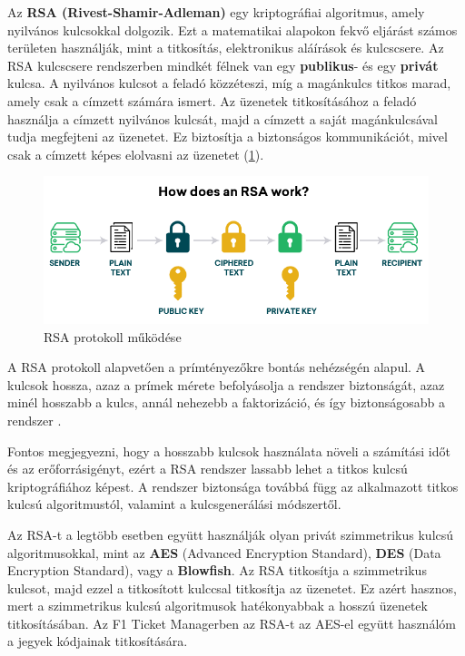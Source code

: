 Az \textbf{RSA (Rivest-Shamir-Adleman)} egy kriptográfiai algoritmus, amely nyilvános kulcsokkal dolgozik. Ezt a matematikai alapokon fekvő eljárást számos területen használják, mint a titkosítás, elektronikus aláírások és kulcscsere. Az RSA kulcscsere rendszerben mindkét félnek van egy \textbf{publikus}- és egy \textbf{privát} kulcsa. A nyilvános kulcsot a feladó közzéteszi, míg a magánkulcs titkos marad, amely csak a címzett számára ismert. Az üzenetek titkosításához a feladó használja a címzett nyilvános kulcsát, majd a címzett a saját magánkulcsával tudja megfejteni az üzenetet. Ez biztosítja a biztonságos kommunikációt, mivel csak a címzett képes elolvasni az üzenetet (\ref{abra:rsa}).

\begin{figure}[!h]
	\centering
	\includegraphics[scale=0.4]{images/rsa}
	\caption{RSA protokoll működése}
	\label{abra:rsa}
\end{figure}

A RSA protokoll alapvetően a prímtényezőkre bontás nehézségén alapul. A kulcsok hossza, azaz a prímek mérete befolyásolja a rendszer biztonságát, azaz minél hosszabb a kulcs, annál nehezebb a faktorizáció, és így biztonságosabb a rendszer \cite{SZTE}.

Fontos megjegyezni, hogy a hosszabb kulcsok használata növeli a számítási időt és az erőforrásigényt, ezért a RSA rendszer lassabb lehet a titkos kulcsú kriptográfiához képest. A rendszer biztonsága továbbá függ az alkalmazott titkos kulcsú algoritmustól, valamint a kulcsgenerálási módszertől.

Az RSA-t a legtöbb esetben együtt használják olyan privát szimmetrikus kulcsú algoritmusokkal, mint az \textbf{AES} (Advanced Encryption Standard), \textbf{DES} (Data Encryption Standard), vagy a \textbf{Blowfish}. Az RSA titkosítja a szimmetrikus kulcsot, majd ezzel a titkosított kulccsal titkosítja az üzenetet. Ez azért hasznos, mert a szimmetrikus kulcsú algoritmusok hatékonyabbak a hosszú üzenetek titkosításában. Az F1 Ticket Managerben az RSA-t az AES-el együtt használóm a jegyek kódjainak titkosítására.

